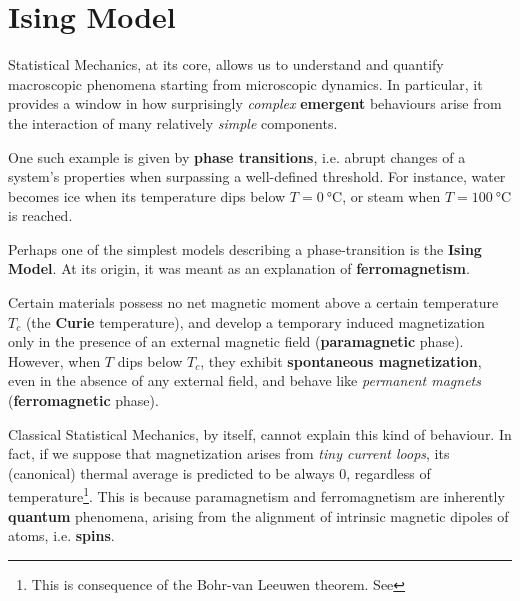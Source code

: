\documentclass[../template.tex]{subfiles}
\begin{document}
\chapter{Ising Model}
Statistical Mechanics, at its core, allows us to understand and quantify macroscopic phenomena starting from microscopic dynamics. In particular, it provides a window in how surprisingly \textit{complex} \textbf{emergent} behaviours arise from the interaction of many relatively \textit{simple}  components.

\medskip

One such example is given by \textbf{phase transitions}, i.e. abrupt changes of a system's properties when surpassing a well-defined threshold. For instance, water becomes ice when its temperature dips below $T=\SI{0}{\celsius}$, or steam when $T = \SI{100}{\celsius}$ is reached.

\medskip

Perhaps one of the simplest models describing a phase-transition is the \textbf{Ising Model}. At its origin, it was meant as an explanation of \textbf{ferromagnetism}. 

Certain materials possess no net magnetic moment above a certain temperature $T_c$ (the \textbf{Curie} temperature), and develop a temporary induced magnetization only in the presence of an external magnetic field (\textbf{paramagnetic} phase). However, when $T$ dips below $T_c$, they exhibit \textbf{spontaneous magnetization}, even in the absence of any external field, and behave like \textit{permanent magnets} (\textbf{ferromagnetic} phase).

\medskip

Classical Statistical Mechanics, by itself, cannot explain this kind of behaviour. In fact, if we suppose that magnetization arises from \textit{tiny current loops}, its (canonical) thermal average is predicted to be always $0$, regardless of temperature\footnote{This is consequence of the Bohr-van Leeuwen theorem. See }. %
This is because paramagnetism and ferromagnetism are inherently \textbf{quantum} phenomena, arising from the alignment of intrinsic magnetic dipoles of atoms, i.e. \textbf{spins}.

\medskip
\end{document}

